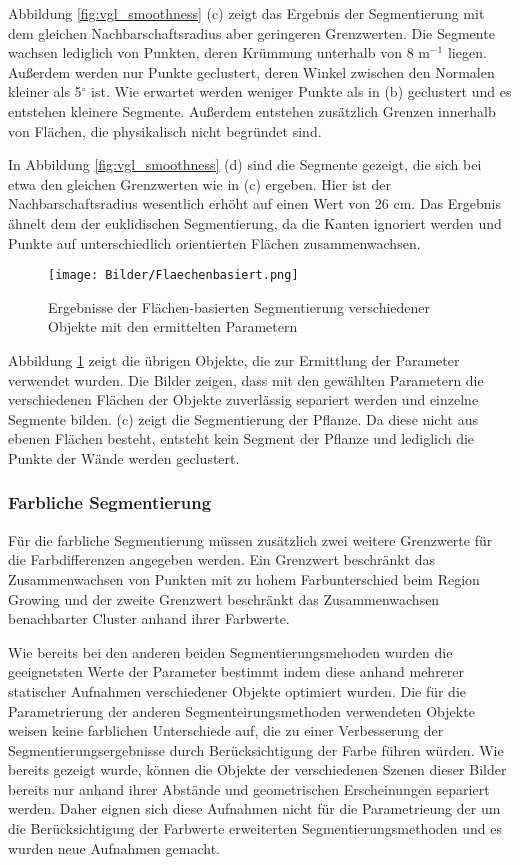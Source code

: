 Abbildung \ref{fig:vgl_smoothness} (c) zeigt das Ergebnis der Segmentierung mit dem gleichen Nachbarschaftsradius aber geringeren Grenzwerten. Die Segmente wachsen lediglich von Punkten, deren Krümmung unterhalb von 8 $ \text{m}^{-1} $ liegen. Außerdem werden nur Punkte geclustert, deren Winkel zwischen den Normalen kleiner als 5$ ^\circ $ ist. Wie erwartet werden weniger Punkte als in (b) geclustert und es entstehen kleinere Segmente. Außerdem entstehen zusätzlich Grenzen innerhalb von Flächen, die physikalisch nicht begründet sind. 

In Abbildung \ref{fig:vgl_smoothness} (d) sind die Segmente gezeigt, die sich bei etwa den gleichen Grenzwerten wie in (c) ergeben. Hier ist der Nachbarschaftsradius wesentlich erhöht auf einen Wert von 26 cm. Das Ergebnis ähnelt dem der euklidischen Segmentierung, da die Kanten ignoriert werden und Punkte auf unterschiedlich orientierten Flächen zusammenwachsen. 

\begin{figure}[hp]
	\centering
	\texttt{[image: Bilder/Flaechenbasiert.png]}
	\caption{Ergebnisse der Flächen-basierten Segmentierung verschiedener Objekte mit den ermittelten Parametern}
	\label{fig:smoothness}
\end{figure}

Abbildung \ref{fig:smoothness} zeigt die übrigen Objekte, die zur Ermittlung der Parameter verwendet wurden. Die Bilder zeigen, dass mit den gewählten Parametern die verschiedenen Flächen der Objekte zuverlässig separiert werden und einzelne Segmente bilden. (c) zeigt die Segmentierung der Pflanze. Da diese nicht aus ebenen Flächen besteht, entsteht kein Segment der Pflanze und lediglich die Punkte der Wände werden geclustert.

\subsubsection{Farbliche Segmentierung}

Für die farbliche Segmentierung müssen zusätzlich zwei weitere Grenzwerte für die Farbdifferenzen angegeben werden. Ein Grenzwert beschränkt das Zusammenwachsen von Punkten mit zu hohem Farbunterschied beim Region Growing und der zweite Grenzwert beschränkt das Zusammenwachsen benachbarter Cluster anhand ihrer Farbwerte. 

Wie bereits bei den anderen beiden Segmentierungsmehoden wurden die geeignetsten Werte der Parameter bestimmt indem diese anhand mehrerer statischer Aufnahmen verschiedener Objekte optimiert wurden. Die für die Parametrierung der anderen Segmenteirungsmethoden verwendeten Objekte weisen keine farblichen Unterschiede auf, die zu einer Verbesserung der Segmentierungsergebnisse durch Berücksichtigung der Farbe führen würden. Wie bereits gezeigt wurde, können die Objekte der verschiedenen Szenen dieser Bilder bereits nur anhand ihrer Abstände und geometrischen Erscheinungen separiert werden. Daher eignen sich diese Aufnahmen nicht für die Parametrieung der um die Berücksichtigung der Farbwerte erweiterten Segmentierungsmethoden und es wurden neue Aufnahmen gemacht. 

